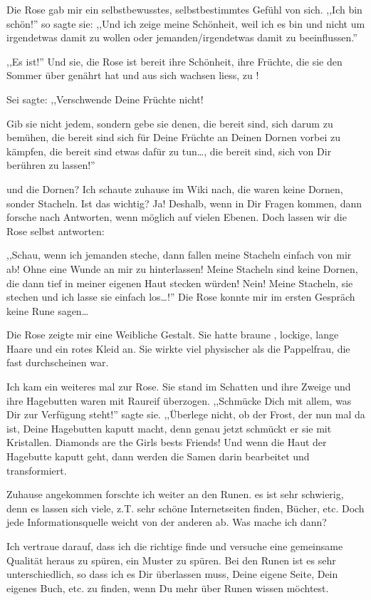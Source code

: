 \documentclass[11pt,titlepage,a5paper]{book}
\begin{document}
Die Rose gab mir ein selbstbewusstes, selbstbestimmtes Gefühl von sich. ,,Ich bin schön!'' so sagte sie: ,,Und ich zeige meine Schönheit, weil ich es bin und nicht um irgendetwas damit zu wollen oder jemanden/irgendetwas damit zu beeinflussen.'' 

,,Es ist!'' Und sie, die Rose ist bereit ihre Schönheit, ihre Früchte, die sie den Sommer über genährt hat und aus sich wachsen liess, zu !

Sei sagte: ,,Verschwende Deine Früchte nicht!

Gib sie nicht jedem, sondern gebe sie denen, die bereit sind, sich darum zu bemühen, die bereit sind sich für Deine Früchte an Deinen Dornen vorbei zu kämpfen, die bereit sind etwas dafür zu tun\dots , die bereit sind, sich von Dir berühren zu lassen!''

und die Dornen? Ich schaute zuhause im Wiki nach, die waren keine Dornen, sonder Stacheln. Ist das wichtig? Ja! Deshalb, wenn in Dir Fragen kommen, dann forsche nach Antworten, wenn möglich auf vielen Ebenen. Doch lassen wir die Rose selbst antworten:

,,Schau, wenn ich jemanden steche, dann fallen meine Stacheln einfach von mir ab! Ohne eine Wunde an mir zu hinterlassen! Meine Stacheln sind keine Dornen, die dann tief in meiner eigenen Haut stecken würden! Nein! Meine Stacheln, sie stechen und ich lasse sie einfach los\dots !'' Die Rose konnte mir im ersten Gespräch keine Rune sagen\dots

Die Rose zeigte mir eine Weibliche Gestalt. Sie hatte braune , lockige, lange Haare und ein rotes Kleid an. Sie wirkte viel physischer als die Pappelfrau, die fast durchscheinen war.

Ich kam ein weiteres mal zur Rose. Sie stand im Schatten und ihre Zweige und ihre Hagebutten waren  mit Raureif überzogen. ,,Schmücke Dich mit allem, was Dir zur Verfügung steht!'' sagte sie. ,,Überlege nicht, ob der Frost, der nun mal da ist, Deine Hagebutten kaputt macht, denn genau jetzt schmückt er sie mit Kristallen. Diamonds are the Girls bests Friends! Und wenn die Haut der Hagebutte kaputt geht, dann werden die Samen darin bearbeitet und transformiert.

Zuhause angekommen forschte ich weiter an den Runen. es ist sehr schwierig, denn es lassen sich viele, z.T. sehr schöne Internetseiten finden, Bücher, etc. Doch jede Informationsquelle weicht von der anderen ab. Was mache ich dann?

Ich vertraue darauf, dass ich die richtige finde und versuche eine gemeinsame Qualität heraus zu spüren, ein Muster zu spüren. Bei den Runen ist es sehr unterschiedlich, so dass ich es Dir überlassen muss, Deine eigene Seite, Dein eigenes Buch, etc. zu finden, wenn Du mehr über Runen wissen möchtest.
\end{document}
